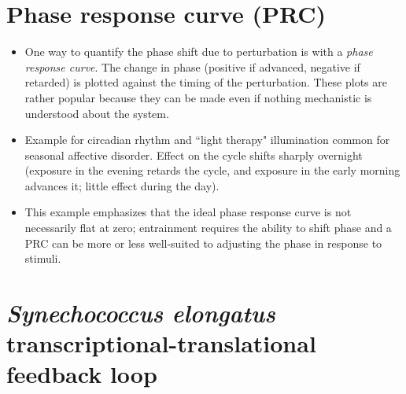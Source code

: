 \documentclass{article}
\begin{document}
\section*{Phase response curve (PRC)}

\begin{itemize}
\item One way to quantify the phase shift due to perturbation is with a \textit{phase response curve}. The change in phase (positive if advanced, negative if retarded) is plotted against the timing of the perturbation. These plots are rather popular because they can be made even if nothing mechanistic is understood about the system.

\item Example for circadian rhythm and ``light therapy" illumination common for seasonal affective disorder. Effect on the cycle shifts sharply overnight (exposure in the evening retards the cycle, and exposure in the early morning advances it; little effect during the day).

\item This example emphasizes that the ideal phase response curve is not necessarily flat at zero; entrainment requires the ability to shift phase and a PRC can be more or less well-suited to adjusting the phase in response to stimuli.

\end{itemize}


\section*{\textit{Synechococcus elongatus} transcriptional-translational feedback loop}
\end{document}
